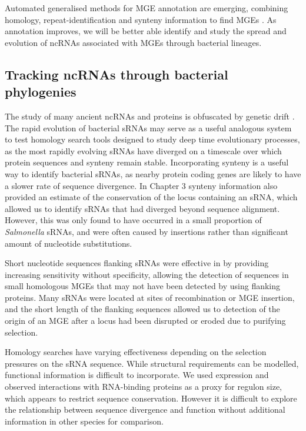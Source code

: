 Automated generalised methods for MGE annotation are emerging, combining homology, repeat-identification and synteny information to find MGEs \citep{Berthelier2018-sd}. As annotation improves, we will be better able identify and study the spread and evolution of ncRNAs associated with MGEs through bacterial lineages.

\subsection{Tracking ncRNAs through bacterial phylogenies}

The study of many ancient ncRNAs and proteins is obfuscated by genetic drift \citep{Hoeppner2012-llpl}. The rapid evolution of bacterial sRNAs may serve as a useful analogous system to test homology search tools designed to study deep time evolutionary processes, as the most rapidly evolving sRNAs have diverged on a timescale over which protein sequences and synteny remain stable.
Incorporating synteny is a useful way to identify bacterial sRNAs, as nearby protein coding genes are likely to have a slower rate of sequence divergence. In Chapter 3 synteny information also provided an estimate of the conservation of the locus containing an sRNA, which allowed us to identify sRNAs that had diverged beyond sequence alignment. However, this was only found to have occurred in a small proportion of \textit{Salmonella} sRNAs, and were often caused by insertions rather than significant amount of nucleotide substitutions.

Short nucleotide sequences flanking sRNAs were effective in by providing increasing sensitivity without specificity, allowing the detection of sequences in small homologous MGEs that may not have been detected by using flanking proteins. Many sRNAs were located at sites of recombination or MGE insertion, and the short length of the flanking sequences allowed us to detection of the origin of an MGE after a locus had been disrupted or eroded due to purifying selection.

Homology searches have varying effectiveness depending on the selection pressures on the sRNA sequence. While structural requirements can be modelled, functional information is difficult to incorporate. We used expression and observed interactions with RNA-binding proteins as a proxy for regulon size, which appears to restrict sequence conservation. However it is difficult to explore the relationship between sequence divergence and function without additional information in other species for comparison.

